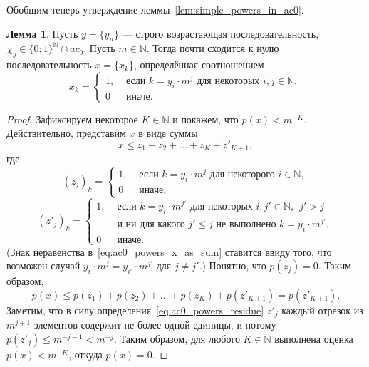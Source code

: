 \documentclass[a4paper,openbib]{article}
\renewcommand{\leq}{\leqslant}
\theoremstyle{definition}
\newtheorem{lemma}{Лемма}[section]
\begin{document}
Обобщим теперь утверждение леммы~\ref{lem:simple_powers_in_ac0}.

\begin{lemma}
	Пусть $y = \{y_n\}$ --- строго возрастающая последовательность,
	$\chi_y\in\{0;1\}^\mathbb{N} \cap ac_0$.
	Пусть $m \in \mathbb{N}$.
	Тогда почти сходится к нулю последовательность $x=\{x_k\}$, определённая соотношением
	\begin{equation}
		x_k = \begin{cases}
			1, &\mbox{~если~} k = y_i \cdot m^j \mbox{~для некоторых~} i,j\in\mathbb{N},
			\\
			0  &\mbox{~иначе}
			.
		\end{cases}
	\end{equation}
\end{lemma}

\begin{proof}
	Зафиксируем некоторое $K \in \mathbb{N}$ и покажем, что $p(x) < m^{-K}$.
	Действительно, представим $x$ в виде суммы
	\begin{equation}
		\label{eq:ac0_powers_x_as_sum}
		x \leq z_1 + z_2 + \dots + z_K + z'_{K+1}
		,
	\end{equation}
	где
	\begin{equation}
		(z_j)_k = \begin{cases}
			1, &\mbox{~если~} k = y_i \cdot m^j \mbox{~для некоторого~} i\in\mathbb{N},
			\\
			0  &\mbox{~иначе}
			,
		\end{cases}
	\end{equation}
	\begin{equation}
		\label{eq:ac0_powers_residue}
		(z'_j)_k = \begin{cases}
			1, &\mbox{~если~} k = y_i \cdot m^{j'} \mbox{~для некоторых~} i,j'\in\mathbb{N},~~ j' > j
			\\ &\mbox{~и ни для какого~} j' \leq j \mbox{~не выполнено~} k = y_i \cdot m^{j'},
			\\
			0  &\mbox{~иначе}
			.
		\end{cases}
	\end{equation}
	(Знак неравенства в~\eqref{eq:ac0_powers_x_as_sum} ставится ввиду того, что возможен случай
	$y_i \cdot m^j = y_{i'} \cdot m^{j'}$ для $j\neq j'$.)
	Понятно, что $p(z_j)=0$.
	Таким образом,
	\begin{equation}
		p(x) \leq p(z_1) + p(z_2) + \dots + p(z_K) + p(z'_{K+1}) = p(z'_{K+1})
		.
	\end{equation}
	Заметим, что в силу определения~\eqref{eq:ac0_powers_residue} $z'_j$ каждый отрезок из $m^{j+1}$ элементов
	содержит не более одной единицы, и потому $p(z'_j) \leq m^{-j-1} < m^{-j}$.
	Таким образом, для любого $K\in\mathbb{N}$ выполнена оценка $p(x) < m^{-K}$,
	откуда $p(x) = 0$.
\end{proof}
\end{document}
